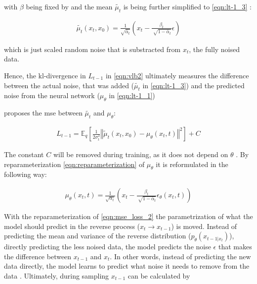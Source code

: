 with $\beta$ being fixed by \cite{ho2020DenoisingDiffusionProbabilistic} and the mean $\tilde{\mu_t}$ is being further simplified to \autoref{eqn:lt-1_3} \cite{ho2020DenoisingDiffusionProbabilistic}:

\begin{equation}
  \begin{align}
    \label{eqn:lt-1_3}
    \tilde{\mu_t}(x_t, x_0) = \frac{1}{\sqrt{\bar{\alpha}_t}}(x_t - \frac{\beta_t}{\sqrt[]{1-\bar{\alpha}_t}}\epsilon)
  \end{align}
\end{equation}

which is just scaled random noise that is substracted from $x_t$, the fully noised data.

Hence, the \gls{kl}-divergence in $L_{t-1}$ in \autoref{eqn:vlb2} ultimately measures the difference between the actual noise, that was added ($\tilde{\mu_t}$ in \autoref{eqn:lt-1_3}) and the predicted noise from the neural network ($\mu_\theta$ in \autoref{eqn:lt-1_1})

\cite{ho2020DenoisingDiffusionProbabilistic} proposes the \gls{mse} between $\tilde{\mu_t}$ and $\mu_\theta$:

\begin{equation}
  \begin{align}
    \label{eqn:mse_loss}
    L_{t-1} = \mathbb{E}_q \left[ \frac{1}{2\sigma_t^2} \left\Vert \tilde{\mu}_t(x_t, x_0) - \mu_\theta(x_t, t) \right\Vert^2 \right] + C
  \end{align}
\end{equation}

The constant $C$ will be removed during training, as it does not depend on $\theta$ \cite{ho2020DenoisingDiffusionProbabilistic}.
By reparameterization \autoref{eqn:reparameterization} of $\mu_\theta$ it is reformulated in the following way:

\begin{equation}
  \begin{align}
    \label{eqn:mse_loss_2}
    \mu_\theta(x_t,t)= \frac{1}{\sqrt{\alpha_t}}(x_t - \frac{\beta_t}{\sqrt[]{1-\bar{\alpha}_t}}\epsilon_\theta(x_t,t)) 
  \end{align}
\end{equation}

With the reparameterization of \autoref{eqn:mse_loss_2} the parametrization of what the model should predict in the reverse process ($x_t \rightarrow x_{t-1}$) is moved. 
Instead of predicting the mean and variance of the reverse distribution ($p_\theta(x_{t-1|x_t})$), \ie directly predicting the less noised data, 
the model predicts the noise $\epsilon$ that makes the difference between $x_{t-1}$ and ${x_t}$.
In other words, instead of predicting the new data directly, the model learns to predict what noise it needs to remove from the data \cite{capel2022MasterThesisDenoising}.
Ultimately, during sampling $x_{t-1}$ can be calculated by

